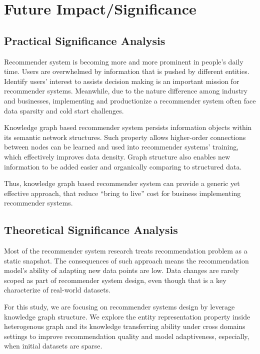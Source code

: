 \section{Future Impact/Significance}

\subsection{Practical Significance Analysis}
Recommender system is becoming more and more prominent in people's daily time. Users are overwhelmed by information that is pushed by different entities. Identify users' interest to assists decision making is an important mission for recommender systems. Meanwhile, due to the nature difference among industry and businesses, implementing and productionize a recommender system often face data sparsity and cold start challenges.  

Knowledge graph based recommender system persists information objects within its semantic network structures. Such property allows higher-order connections between nodes can be learned and used into recommender systems' training, which effectively improves data density. Graph structure also enables new information to be added easier and organically comparing to structured data.  

Thus, knowledge graph based recommender system can provide a generic yet effective approach, that reduce “bring to live” cost for business implementing recommender systems. 

\subsection{Theoretical Significance Analysis}
Most of the recommender system research treats recommendation problem as a static snapshot. The consequences of such approach means the recommendation model's ability of adapting new data points are low. Data changes are rarely scoped as part of recommender system design, even though that is a key characterize of real-world datasets. 

For this study, we are focusing on recommender systems design by leverage knowledge graph structure. We explore the entity representation property inside heterogenous graph and its knowledge transferring ability under cross domains settings to improve recommendation quality and model adaptiveness, especially, when initial datasets are sparse.


